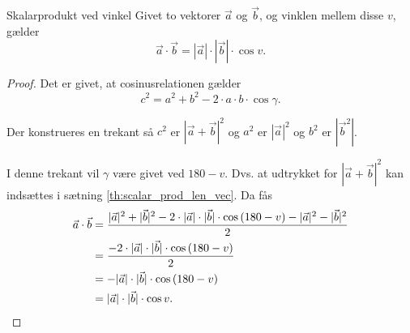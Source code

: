 \documentclass{article}
\begin{document}
\begin{theorem}{Skalarprodukt ved vinkel}{}
    Givet to vektorer $\vec{a}$ og $\vec{b}$, og vinklen mellem disse $v$, gælder
    \[
        \vec{a} \cdot \vec{b} = |\vec{a}| \cdot |\vec{b}| \cdot \cos{v}.
    \] 
\end{theorem}
\begin{proof}
Det er givet, at cosinusrelationen gælder
\[
    c^2 = a^2 + b^2 - 2 \cdot a \cdot b \cdot \cos{\gamma}.
\] 
\begin{center}
\end{center}

Der konstrueres en trekant så $c^2$ er $|\vec{a} + \vec{b}|^2$ og $a^2$ er
$|\vec{a}|^2$ og $b^2$ er $|\vec{b}^2|$.
\smallskip

\begin{center}
\end{center}

I denne trekant vil $\gamma$ være givet ved $180 - v$. Dvs. at udtrykket for
$|\vec{a} + \vec{b}|^2$ kan indsættes i sætning \ref{th:scalar_prod_len_vec}.
Da fås
\begin{align*}
    \vec{a} \cdot \vec{b} &= \frac{|\vec{a}|^2 + |\vec{b}|^2 - 2 \cdot |\vec{a}| \cdot |\vec{b}| \cdot \cos{(180 - v)} - |\vec{a}|^2 - |\vec{b}|^2}{2}\\
                          &= \frac{- 2 \cdot |\vec{a}| \cdot |\vec{b}| \cdot \cos{(180 - v)}}{2}\\
                          &= -|\vec{a}| \cdot |\vec{b}| \cdot \cos{(180 - v)}\\
                          &= |\vec{a}| \cdot |\vec{b}| \cdot \cos{v}.\qedhere
\end{align*}
\end{proof}
\end{document}
